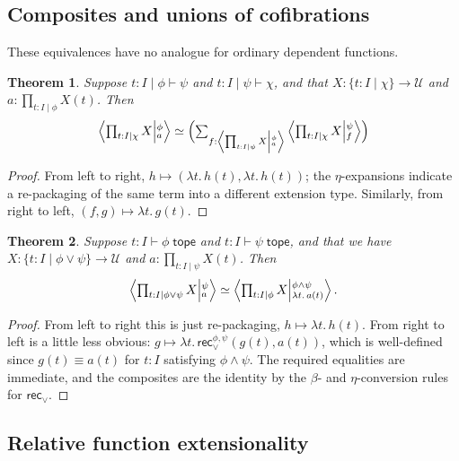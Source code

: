 \documentclass{amsart}
\theoremstyle{plain}
\newtheorem{thm}{Theorem}[section]
\theoremstyle{definition}
\theoremstyle{remark}
\numberwithin{equation}{section}
\newcommand{\tprod}{\textstyle\prod}
\newcommand{\tsum}{\textstyle\sum}
\newcommand{\exten}[4]{\left\langle\mathchoice{\textstyle\prod_{#1}}{\textstyle\prod_{#1}}{\scriptstyle\prod_{#1}}{\scriptscriptstyle\prod_{#1}} #2 \middle|^{#3}_{#4}\right\rangle}
\newcommand{\jdeq}{\equiv}
\newcommand{\types}{\vdash}
\newcommand{\univtype}{\mathcal{U}}
\newcommand{\tope}{\;\mathsf{tope}}
\newcommand{\sh}[2]{\{#1\mid #2\}}
\newcommand{\rec}{\mathsf{rec}}
\newcommand{\lam}[1]{\lambda #1.\,}
\newcommand{\Parens}[1]{\Bigl(#1\Bigr)}
\begin{document}
\subsection{Composites and unions of cofibrations}
\label{sec:compose-cofib}

These equivalences have no analogue for ordinary dependent functions.

\begin{thm}\label{thm:exten-compose}
  Suppose $t:I \mid \phi\types \psi$ and $t:I\mid \psi\types\chi$, and that $X:\sh{t:I}{\chi}\to\univtype$ and $a:\tprod_{t:I\mid\phi} X(t)$.
  Then
  \[
  \exten{t:I|\chi}{X}{\phi}{a} \simeq
  \Parens{\tsum_{f:\exten{t:I|\psi}{X}{\phi}{a}} \exten{t:I|\chi}{X}{\psi}{f}} \]
\end{thm}
\begin{proof}
  From left to right, $h\mapsto (\lam{t} h(t), \lam{t} h(t))$; the $\eta$-expansions indicate a re-packaging of the same term into a different extension type.
  Similarly, from right to left, $(f,g) \mapsto \lam{t} g(t)$.
\end{proof}

\begin{thm}\label{thm:exten-union}
  Suppose $t:I \types \phi\tope$ and $t:I \types \psi\tope$, and that we have $X:\sh{t:I}{\phi\lor\psi}\to\univtype$ and $a:\tprod_{t:I\mid\psi} X(t)$.
  Then
  \[ \exten{t:I|\phi\lor\psi}{X}{\psi}{a} \simeq
  \exten{t:I|\phi}{X}{\phi\land\psi}{\lam{t}a(t)}.
  \]
\end{thm}
\begin{proof}
  From left to right this is just re-packaging, $h\mapsto \lam{t} h(t)$.
  From right to left is a little less obvious: $g \mapsto \lam{t} \rec_\lor^{\phi,\psi}(g(t),a(t))$, which is well-defined since $g(t)\jdeq a(t)$ {for $t:I$ satisfying $\phi\land\psi$.}
  The required equalities are immediate, and the composites are the identity by the $\beta$- and $\eta$-conversion rules for $\rec_\lor$.
\end{proof}


\subsection{Relative function extensionality}
\label{sec:funext}
\end{document}
